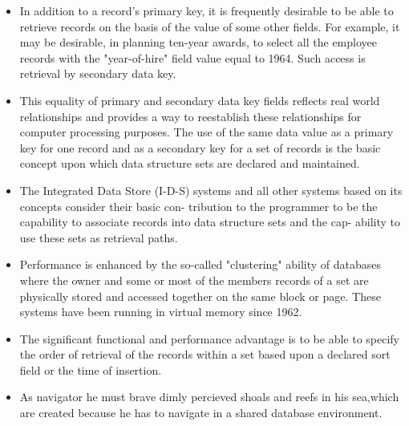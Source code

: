 \documentclass[a4paper]{article}
\begin{document}
\begin{itemize}
\item In addition to a record's primary key, it is frequently
desirable to be able to retrieve records on the basis of
the value of some other fields. For example, it may be
desirable, in planning ten-year awards, to select all the
employee records with the "year-of-hire" field value
equal to 1964. Such access is retrieval by secondary data key.
\item This equality of primary and secondary data key
fields reflects real world relationships and provides a
way to reestablish these relationships for computer
processing purposes. The use of the same data value as
a primary key for one record and as a secondary key
for a set of records is the basic concept upon which
data structure sets are declared and maintained.
\item The Integrated Data Store (I-D-S) systems and all other
systems based on its concepts consider their basic con-
tribution to the programmer to be the capability to
associate records into data structure sets and the cap-
ability to use these sets as retrieval paths.
\item Performance is enhanced by the so-called "clustering" ability of databases where the owner and some or most of the members records of a set are physically stored and accessed together on the same block or page. These systems have
been running in virtual memory since 1962.
\item The significant functional and performance
advantage is to be able to specify the order of retrieval
of the records within a set based upon a declared sort
field or the time of insertion.
\item As navigator he must brave dimly percieved shoals and reefs in his sea,which are created because he has to navigate in a shared database environment.
\end{itemize}
\end{document}
